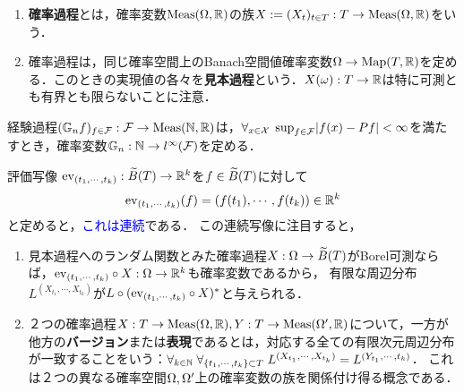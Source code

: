 \documentclass[uplatex,dvipdfmx]{jsreport}
\begin{document}
\begin{definition}\mbox{}
    \begin{enumerate}
        \item \textbf{確率過程}とは，確率変数$\mathrm{Meas}(\Omega,\mathbb{R})$の族$X:=(X_t)_{t\in T}:T\to\mathrm{Meas}(\Omega,\mathbb{R})$をいう．
        \item 確率過程は，同じ確率空間上のBanach空間値確率変数$\Omega\to\mathrm{Map}(T,\mathbb{R})$を定める．このときの実現値の各々を\textbf{見本過程}という．$X(\omega):T\to\mathbb{R}$は特に可測とも有界とも限らないことに注意．
    \end{enumerate}
\end{definition}
\begin{example}
    経験過程$(\mathbb{G}_nf)_{f\in\mathcal{F}}:\mathcal{F}\to\mathrm{Meas}(\mathbb{N},\mathbb{R})$は，$\forall_{x\in\mathcal{X}}\;\sup_{f\in\mathcal{F}}\lvert f(x)-Pf\rvert<\infty$を満たすとき，確率変数$\mathbb{G}_n:\mathbb{N}\to l^\infty(\mathcal{F})$を定める．
\end{example}

\begin{definition}
    評価写像
    $\mathrm{ev}_{(t_1,\cdots,t_k)}:\widetilde{B}(T)\to\mathbb{R}^k$を$f\in\widetilde{B}(T)$に対して
    \[\mathrm{ev}_{(t_1,\cdots,t_k)}(f)=(f(t_1),\cdots,f(t_k))\in\mathbb{R}^k\]
    と定めると，\textcolor{blue}{これは連続}である．
    この連続写像に注目すると，
    \begin{enumerate}
        \item 見本過程へのランダム関数とみた確率過程$X:\Omega\to\widetilde{B}(T)$がBorel可測ならば，$\mathrm{ev}_{(t_1,\cdots,t_k)}\circ X:\Omega\to\mathbb{R}^k$も確率変数であるから，
        有限な周辺分布$L^{(X_{t_1},\cdots,X_{t_k})}$が$L\circ(\mathrm{ev}_{(t_1,\cdots,t_k)}\circ X)^*$と与えられる．
        \item ２つの確率過程$X:T\to\mathrm{Meas}(\Omega,\mathbb{R}),Y:T\to\mathrm{Meas}(\Omega',\mathbb{R})$について，一方が他方の\textbf{バージョン}または\textbf{表現}であるとは，対応する全ての有限次元周辺分布が一致することをいう：$\forall_{k\in\mathbb{N}}\;\forall_{\{t_1,\cdots,t_k\}\subset T}\;L^{(X_{t_1},\cdots,X_{t_k})}=L^{(Y_{t_1},\cdots,t_k)}$．
        これは２つの異なる確率空間$\Omega,\Omega'$上の確率変数の族を関係付け得る概念である．
    \end{enumerate}
\end{definition}
\end{document}

